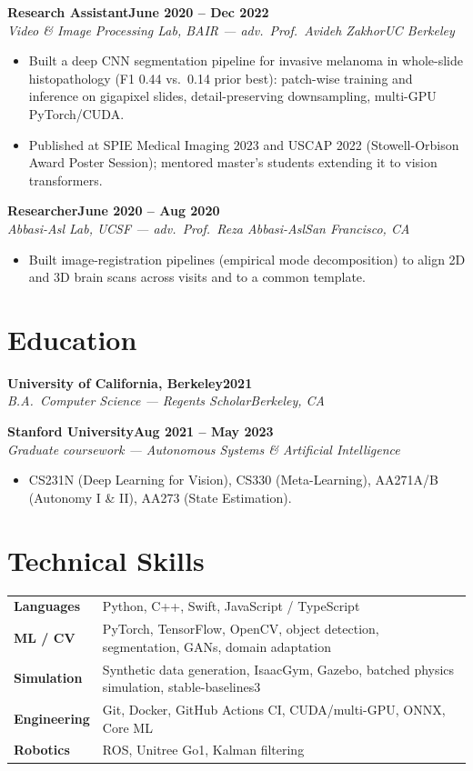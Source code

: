 \documentclass[10pt]{article}
\newcommand{\role}[4]{\textbf{#1}\hfill\textbf{#2}\\\textit{#3}\hfill\textit{#4}}
\begin{document}
\role{Research Assistant}{June 2020 -- Dec 2022}{Video \& Image Processing Lab, BAIR --- adv.\ Prof.\ Avideh Zakhor}{UC Berkeley}
\begin{itemize}
\item Built a deep CNN segmentation pipeline for invasive melanoma in whole-slide histopathology (F1 0.44 vs.\ 0.14 prior best): patch-wise training and inference on gigapixel slides, detail-preserving downsampling, multi-GPU PyTorch/CUDA.
\item Published at SPIE Medical Imaging 2023 and USCAP 2022 (Stowell-Orbison Award Poster Session); mentored master's students extending it to vision transformers.
\end{itemize}

\role{Researcher}{June 2020 -- Aug 2020}{Abbasi-Asl Lab, UCSF --- adv.\ Prof.\ Reza Abbasi-Asl}{San Francisco, CA}
\begin{itemize}
\item Built image-registration pipelines (empirical mode decomposition) to align 2D and 3D brain scans across visits and to a common template.
\end{itemize}

\section*{Education}

\role{University of California, Berkeley}{2021}{B.A.\ Computer Science --- Regents Scholar}{Berkeley, CA}

\role{Stanford University}{Aug 2021 -- May 2023}{Graduate coursework --- Autonomous Systems \& Artificial Intelligence}{}
\begin{itemize}
\item CS231N (Deep Learning for Vision), CS330 (Meta-Learning), AA271A/B (Autonomy I \& II), AA273 (State Estimation).
\end{itemize}

\section*{Technical Skills}
\begin{tabular}{@{}p{0.9in}l}
\textbf{Languages} & Python, C++, Swift, JavaScript / TypeScript \\
\textbf{ML / CV} & PyTorch, TensorFlow, OpenCV, object detection, segmentation, GANs, domain adaptation \\
\textbf{Simulation} & Synthetic data generation, IsaacGym, Gazebo, batched physics simulation, stable-baselines3 \\
\textbf{Engineering} & Git, Docker, GitHub Actions CI, CUDA/multi-GPU, ONNX, Core ML \\
\textbf{Robotics} & ROS, Unitree Go1, Kalman filtering \\
\end{tabular}
\end{document}
